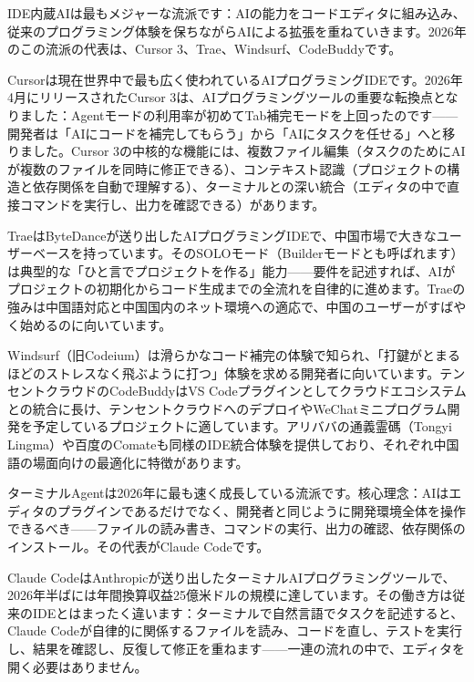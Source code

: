 
IDE内蔵AIは最もメジャーな流派です：AIの能力をコードエディタに組み込み、従来のプログラミング体験を保ちながらAIによる拡張を重ねていきます。2026年のこの流派の代表は、Cursor 3、Trae、Windsurf、CodeBuddyです。


Cursorは現在世界中で最も広く使われているAIプログラミングIDEです。2026年4月にリリースされたCursor 3は、AIプログラミングツールの重要な転換点となりました：Agentモードの利用率が初めてTab補完モードを上回ったのです——開発者は「AIにコードを補完してもらう」から「AIにタスクを任せる」へと移りました。Cursor 3の中核的な機能には、複数ファイル編集（タスクのためにAIが複数のファイルを同時に修正できる）、コンテキスト認識（プロジェクトの構造と依存関係を自動で理解する）、ターミナルとの深い統合（エディタの中で直接コマンドを実行し、出力を確認できる）があります。


TraeはByteDanceが送り出したAIプログラミングIDEで、中国市場で大きなユーザーベースを持っています。そのSOLOモード（Builderモードとも呼ばれます）は典型的な「ひと言でプロジェクトを作る」能力——要件を記述すれば、AIがプロジェクトの初期化からコード生成までの全流れを自律的に進めます。Traeの強みは中国語対応と中国国内のネット環境への適応で、中国のユーザーがすばやく始めるのに向いています。


Windsurf（旧Codeium）は滑らかなコード補完の体験で知られ、「打鍵がとまるほどのストレスなく飛ぶように打つ」体験を求める開発者に向いています。テンセントクラウドのCodeBuddyはVS Codeプラグインとしてクラウドエコシステムとの統合に長け、テンセントクラウドへのデプロイやWeChatミニプログラム開発を予定しているプロジェクトに適しています。アリババの通義霊碼（Tongyi Lingma）や百度のComateも同様のIDE統合体験を提供しており、それぞれ中国語の場面向けの最適化に特徴があります。


ターミナルAgentは2026年に最も速く成長している流派です。核心理念：AIはエディタのプラグインであるだけでなく、開発者と同じように開発環境全体を操作できるべき——ファイルの読み書き、コマンドの実行、出力の確認、依存関係のインストール。その代表がClaude Codeです。


Claude CodeはAnthropicが送り出したターミナルAIプログラミングツールで、2026年半ばには年間換算収益25億米ドルの規模に達しています。その働き方は従来のIDEとはまったく違います：ターミナルで自然言語でタスクを記述すると、Claude Codeが自律的に関係するファイルを読み、コードを直し、テストを実行し、結果を確認し、反復して修正を重ねます——一連の流れの中で、エディタを開く必要はありません。

